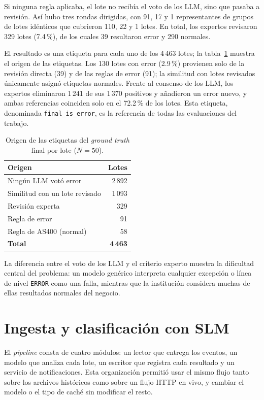 Si ninguna regla aplicaba, el lote no recibía el voto de los LLM, sino que pasaba a revisión. Así hubo tres rondas dirigidas, con 91, 17 y 1 representantes de grupos de lotes idénticos que cubrieron 110, 22 y 1 lotes. En total, los expertos revisaron 329 lotes (7.4\,\%), de los cuales 39 resultaron error y 290 normales.

El resultado es una etiqueta para cada uno de los 4\,463 lotes; la tabla~\ref{tab:met_origen} muestra el origen de las etiquetas. Los 130 lotes con error (2.9\,\%) provienen solo de la revisión directa (39) y de las reglas de error (91); la similitud con lotes revisados únicamente asignó etiquetas normales. Frente al consenso de los LLM, los expertos eliminaron 1\,241 de sus 1\,370 positivos y añadieron un error nuevo, y ambas referencias coinciden solo en el 72.2\,\% de los lotes. Esta etiqueta, denominada \texttt{final\_is\_error}, es la referencia de todas las evaluaciones del trabajo.

\begin{table}[H]
\centering
\caption{Origen de las etiquetas del \textit{ground truth} final por lote ($N=50$).}
\label{tab:met_origen}
\small
\begin{tabular}{@{}lr@{}}
\toprule
\textbf{Origen} & \textbf{Lotes} \\
\midrule
Ningún LLM votó error & 2\,892 \\
Similitud con un lote revisado & 1\,093 \\
Revisión experta & 329 \\
Regla de error & 91 \\
Regla de AS400 (normal) & 58 \\
\midrule
\textbf{Total} & \textbf{4\,463} \\
\bottomrule
\end{tabular}
\normalsize
\end{table}

La diferencia entre el voto de los LLM y el criterio experto muestra la dificultad central del problema: un modelo genérico interpreta cualquier excepción o línea de nivel \texttt{ERROR} como una falla, mientras que la institución considera muchas de ellas resultados normales del negocio.

\section{Ingesta y clasificación con SLM}\label{sec:met_arquitectura}

El \textit{pipeline} consta de cuatro módulos: un lector que entrega los eventos, un modelo que analiza cada lote, un escritor que registra cada resultado y un servicio de notificaciones. Esta organización permitió usar el mismo flujo tanto sobre los archivos históricos como sobre un flujo HTTP en vivo, y cambiar el modelo o el tipo de caché sin modificar el resto.

